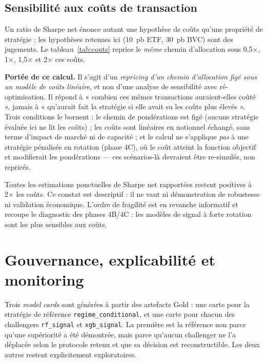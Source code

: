 \subsection{Sensibilité aux coûts de transaction}

Un ratio de Sharpe net énonce autant une hypothèse de coûts qu'une propriété de
stratégie ; les hypothèses retenues ici (10~pb ETF, 30~pb BVC) sont des
jugements. Le tableau~\ref{tab:couts} reprice le \emph{même} chemin d'allocation
sous 0,5×, 1×, 1,5× et 2× ces coûts.



\textbf{Portée de ce calcul.} Il s'agit d'un \emph{repricing d'un chemin
d'allocation figé sous un modèle de coûts linéaire}, et non d'une analyse de
sensibilité avec ré-optimisation. Il répond à « combien ces mêmes transactions
auraient-elles coûté », jamais à « qu'aurait fait la stratégie si elle avait su
les coûts plus élevés ». Trois conditions le bornent : le chemin de pondérations
est figé (aucune stratégie évaluée ici ne lit les coûts) ; les coûts sont
linéaires en notionnel échangé, sans terme d'impact de marché ni de capacité ;
et le calcul ne s'applique \emph{pas} à une stratégie pénalisée en rotation
(phase 4C), où le coût atteint la fonction objectif et modifierait les
pondérations — ces scénarios-là devraient être re-simulés, non repricés.

Toutes les estimations ponctuelles de Sharpe net rapportées restent positives à
2× les coûts. Ce constat est descriptif : il ne vaut ni démonstration de
robustesse ni validation économique. L'ordre de fragilité est en revanche
informatif et recoupe le diagnostic des phases 4B/4C : les modèles de signal à
forte rotation sont les plus sensibles aux coûts.

\section{Gouvernance, explicabilité et monitoring}

Trois \emph{model cards} sont générées à partir des artefacts Gold : une carte
pour la stratégie de référence \texttt{regime\_conditional}, et une carte pour
chacun des challengers \texttt{rf\_signal} et \texttt{xgb\_signal}. La première
est la référence non parce qu'une supériorité a été démontrée, mais parce qu'aucun
challenger ne l'a déplacée selon le protocole retenu et que sa décision est
reconstructible. Les deux autres restent explicitement exploratoires.

